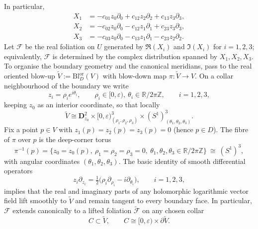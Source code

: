 \documentclass[11pt]{amsart}
\theoremstyle{plain}
\theoremstyle{definition}
\theoremstyle{definition}
\begin{document}
In particular,
\begin{align}
X_1 &= -c_{01} z_0\partial_0 + c_{12} z_2\partial_2 + c_{13} z_3\partial_3,\label{eq:X1}\\
X_2 &= -c_{02} z_0\partial_0 - c_{12} z_1\partial_1 + c_{23} z_3\partial_3,\label{eq:X2}\\
X_3 &= -c_{03} z_0\partial_0 - c_{13} z_1\partial_1 - c_{23} z_2\partial_2.\label{eq:X3}
\end{align}
Let $\mathcal F$ be the real foliation on $U$ generated by $\Re(X_i)$ and $\Im(X_i)$ for $i=1,2,3$; equivalently, $\mathcal F$ is determined by the complex distribution spanned by $X_1,X_2,X_3$. To organise the boundary geometry and the canonical meridians, pass to the real oriented blow-up $\widetilde V:=\mathrm{Bl}^{\mathrm{or}}_{D}(V)$ with blow-down map $\pi:\widetilde V\to V$. On a collar neighbourhood of the boundary we write
\begin{equation}\label{eq:polar-explicit}
z_i=\rho_i e^{i\theta_i},
\qquad
\rho_i\in[0,\varepsilon),\ \theta_i\in\mathbb{R}/2\pi\mathbb{Z},
\qquad i=1,2,3,
\end{equation}
keeping $z_0$ as an interior coordinate, so that locally
\begin{equation}\label{eq:local-product}
\widetilde V \cong \mathbf D^2_{z_0}\times[0,\varepsilon)^3_{(\rho_1,\rho_2,\rho_3)}\times (S^1)^3_{(\theta_1,\theta_2,\theta_3)}.
\end{equation}
Fix a point $p\in V$ with $z_1(p)=z_2(p)=z_3(p)=0$ (hence $p\in D$). The fibre of $\pi$ over $p$ is the deep-corner torus
\begin{equation}\label{eq:corner-fiber-explicit}
\pi^{-1}(p)=\{z_0=z_0(p),\ \rho_1=\rho_2=\rho_3=0,\ \theta_1,\theta_2,\theta_3\in\mathbb{R}/2\pi\mathbb{Z}\}\ \cong\ (S^1)^3,
\end{equation}
with angular coordinates $(\theta_1,\theta_2,\theta_3)$. The basic identity of smooth differential operators
\begin{equation}\label{eq:operator}
z_i\partial_{z_i}=\tfrac12\bigl(\rho_i\partial_{\rho_i}-i\partial_{\theta_i}\bigr),\qquad i=1,2,3,
\end{equation}
implies that the real and imaginary parts of any holomorphic logarithmic vector field lift smoothly to $\widetilde V$ and remain tangent to every boundary face. In particular, $\mathcal F$ extends canonically to a lifted foliation $\widetilde{\mathcal F}$ on any chosen collar
\begin{equation}\label{eq:collar}
C\subset\widetilde V,
\qquad
C\cong[0,\varepsilon)\times\partial\widetilde V.
\end{equation}
\end{document}
